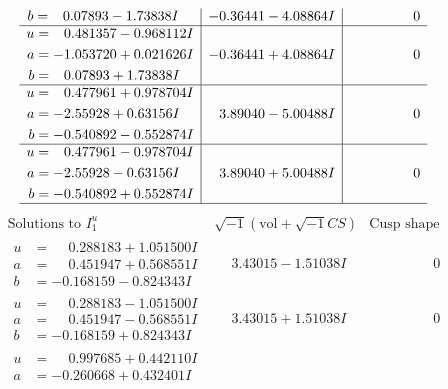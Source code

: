 \documentclass[1p]{elsarticle_modified}
\theoremstyle{definition}
\newcommand{\I}{\sqrt{-1}}
\begin{document}
$$\begin{array}{c|c|c}
\begin{aligned}
b &= \phantom{-}0.07893 - 1.73838 I\end{aligned}
 & -0.36441 - 4.08864 I & \phantom{-0.000000 } 0 \\ \hline\begin{aligned}
u &= \phantom{-}0.481357 - 0.968112 I \\
a &= -1.053720 + 0.021626 I \\
b &= \phantom{-}0.07893 + 1.73838 I\end{aligned}
 & -0.36441 + 4.08864 I & \phantom{-0.000000 } 0 \\ \hline\begin{aligned}
u &= \phantom{-}0.477961 + 0.978704 I \\
a &= -2.55928 + 0.63156 I \\
b &= -0.540892 - 0.552874 I\end{aligned}
 & \phantom{-}3.89040 - 5.00488 I & \phantom{-0.000000 } 0 \\ \hline\begin{aligned}
u &= \phantom{-}0.477961 - 0.978704 I \\
a &= -2.55928 - 0.63156 I \\
b &= -0.540892 + 0.552874 I\end{aligned}
 & \phantom{-}3.89040 + 5.00488 I & \phantom{-0.000000 } 0\\
 \hline 
 \end{array}$$\newpage$$\begin{array}{c|c|c}  
\text{Solutions to }I^u_{1}& \I (\text{vol} + \sqrt{-1}CS) & \text{Cusp shape}\\
 \hline 
\begin{aligned}
u &= \phantom{-}0.288183 + 1.051500 I \\
a &= \phantom{-}0.451947 + 0.568551 I \\
b &= -0.168159 - 0.824343 I\end{aligned}
 & \phantom{-}3.43015 - 1.51038 I & \phantom{-0.000000 } 0 \\ \hline\begin{aligned}
u &= \phantom{-}0.288183 - 1.051500 I \\
a &= \phantom{-}0.451947 - 0.568551 I \\
b &= -0.168159 + 0.824343 I\end{aligned}
 & \phantom{-}3.43015 + 1.51038 I & \phantom{-0.000000 } 0 \\ \hline\begin{aligned}
u &= \phantom{-}0.997685 + 0.442110 I \\
a &= -0.260668 + 0.432401 I \\

\end{aligned}
\end{array}$$
\end{document}
